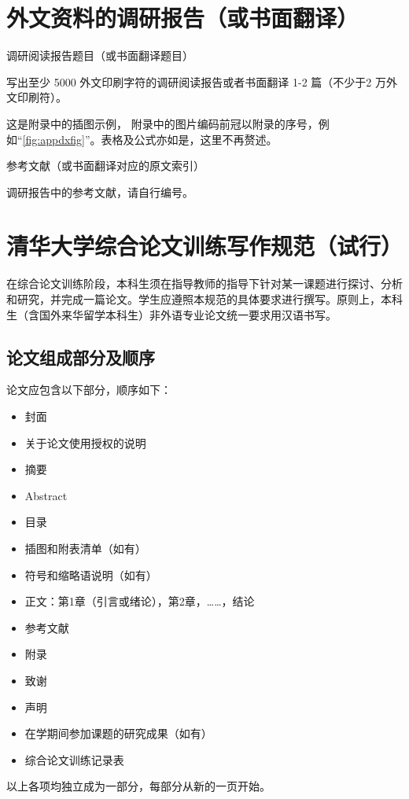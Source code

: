 \documentclass{Diploma}
\begin{document}
\begin{}

\StartAppendix%
\chapter{外文资料的调研报告（或书面翻译）}
\begin{center}
调研阅读报告题目（或书面翻译题目）
\end{center}

写出至少 5000 外文印刷字符的调研阅读报告或者书面翻译 1-2 篇（不少于2 万外文印刷符）。

这是附录中的插图示例，
%
附录中的图片编码前冠以附录的序号，例如“\ref{fig:appdxfig}”。表格及公式亦如是，这里不再赘述。

\begin{center}
参考文献（或书面翻译对应的原文索引）
\end{center}
\begin{reflist}
  \item 调研报告中的参考文献，请自行编号。
\end{reflist}

\chapter[require]{清华大学综合论文训练写作规范（试行）}
在综合论文训练阶段，本科生须在指导教师的指导下针对某一课题进行探讨、分析和研究，并完成一篇论文。学生应遵照本规范的具体要求进行撰写。原则上，本科生（含国外来华留学本科生）非外语专业论文统一要求用汉语书写。

\section{论文组成部分及顺序}
论文应包含以下部分，顺序如下：
\begin{itemize}
  \item 封面
  \item 关于论文使用授权的说明
  \item 摘要
  \item Abstract
  \item 目录
  \item 插图和附表清单（如有）
  \item 符号和缩略语说明（如有）
  \item 正文：第1章（引言或绪论），第2章，……，结论
  \item 参考文献
  \item 附录
  \item 致谢
  \item 声明
  \item 在学期间参加课题的研究成果（如有）
  \item 综合论文训练记录表
\end{itemize}
以上各项均独立成为一部分，每部分从新的一页开始。


\end{}
\end{document}
